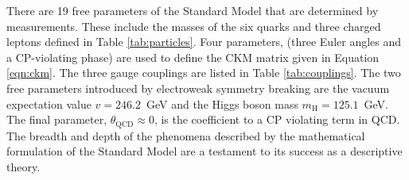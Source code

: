 There are 19 free parameters of the Standard Model that are determined by measurements.
These include the masses of the six quarks and three charged leptons defined in Table \ref{tab:particles}.
Four parameters, (three Euler angles and a CP-violating phase) are used to define the CKM matrix given in Equation \ref{eqn:ckm}.
The three gauge couplings are listed in Table \ref{tab:couplings}.
The two free parameters introduced by electroweak symmetry breaking are the vacuum expectation value $v=246.2$~GeV and the Higgs boson mass $m_\text{H}=125.1$~GeV.
The final parameter, $\theta_\text{QCD}\approx0$, is the coefficient to a CP violating term in QCD.
The breadth and depth of the phenomena described by the mathematical formulation of the Standard Model are a testament to its success as a descriptive theory.


